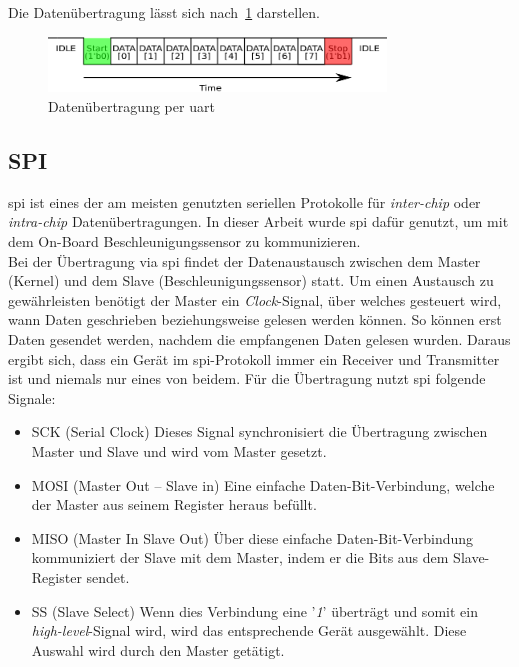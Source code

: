 Die Datenübertragung lässt sich nach~\ref{fig:uart} darstellen.\\

\begin{figure}[h!]
\centering
\includegraphics[width=0.8\textwidth]{Hauptteil/uart.eps}
\caption{Datenübertragung per \ac{uart} }
\label{fig:uart}
\end{figure}


\subsection{SPI}\label{kap:spi}

\ac{spi} ist eines der am meisten genutzten seriellen Protokolle für \emph{inter-chip}
oder \emph{intra-chip} Datenübertragungen. In dieser Arbeit wurde \ac{spi} dafür genutzt,
um mit dem On-Board Beschleunigungssensor zu kommunizieren. \\
Bei der Übertragung via \ac{spi} findet der Datenaustausch zwischen dem Master (Kernel)
und dem Slave (Beschleunigungssensor) statt. Um einen Austausch zu gewährleisten benötigt der Master
ein \emph{Clock}-Signal, über welches gesteuert wird, wann Daten geschrieben beziehungsweise
gelesen werden können. So können erst Daten gesendet werden, nachdem die empfangenen
Daten gelesen wurden. Daraus ergibt sich, dass ein Gerät im \ac{spi}-Protokoll immer ein
Receiver und Transmitter ist und niemals nur eines von beidem.
Für die Übertragung nutzt \ac{spi} folgende Signale:

\begin{itemize}
\item SCK (Serial Clock) Dieses Signal synchronisiert die Übertragung zwischen Master und Slave
      und wird vom Master gesetzt.
\item MOSI (Master Out – Slave in) Eine einfache Daten-Bit-Verbindung, welche der Master aus seinem
      Register heraus befüllt.
\item MISO (Master In  Slave Out) Über diese einfache Daten-Bit-Verbindung kommuniziert der
      Slave mit dem Master, indem er die Bits aus dem Slave-Register sendet.
\item SS (Slave Select) Wenn dies Verbindung eine '\emph{1}' überträgt und somit ein \emph{high-level}-Signal
      wird, wird das entsprechende Gerät ausgewählt. Diese Auswahl wird durch den Master getätigt.
\end{itemize}

